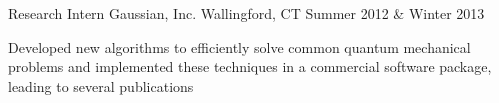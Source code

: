 \begin{cventries}

\cventry
{Research Intern} %
{Gaussian, Inc.} %
{Wallingford, CT} %
{Summer 2012 \& Winter 2013} %
{ %
\begin{cvitems}
\item {Developed new algorithms to efficiently solve common quantum mechanical problems and implemented these techniques in a commercial software package, leading to several publications}
\end{cvitems}
}



\end{cventries}